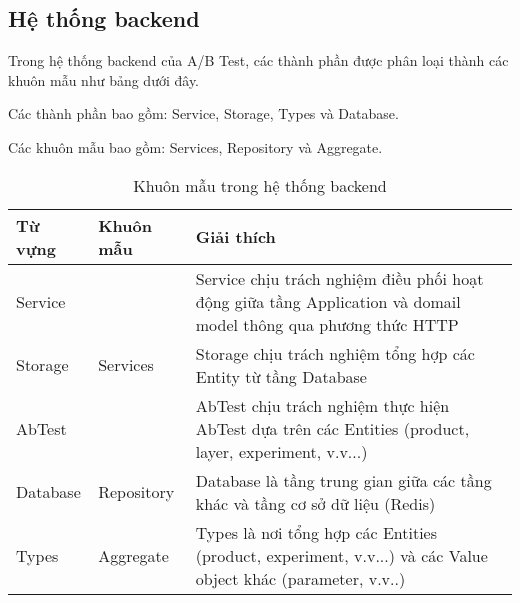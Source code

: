 \subsection{Hệ thống backend}

Trong hệ thống backend của A/B Test, các thành phần được phân loại thành các khuôn mẫu như bảng dưới đây.

Các thành phần bao gồm: Service, Storage, Types và Database.

Các khuôn mẫu bao gồm: Services, Repository và Aggregate.

\begin{table}[H]
	\centering
	\begin{tabular}{|l|l|p{12cm}|}
		\hline
		Từ vựng  & Khuôn mẫu                 & Giải thích                                                                                                     \\ \hline
		Service  & \multirow{3}{*}{Services} & Service chịu trách nghiệm điều phối hoạt động giữa tầng Application và domail model thông qua phương thức HTTP \\ \cline{1-1} \cline{3-3}
		Storage  &                           & Storage chịu trách nghiệm tổng hợp các Entity từ tầng Database                                                 \\ \cline{1-1} \cline{3-3}
		AbTest   &                           & AbTest chịu trách nghiệm thực hiện AbTest dựa trên các Entities (product, layer, experiment, v.v...)           \\ \hline
		Database & Repository                & Database là tầng trung gian giữa các tầng khác và tầng cơ sở dữ liệu (Redis)                                   \\ \hline
		Types    & Aggregate                 & Types là nơi tổng hợp các Entities (product, experiment, v.v...) và các Value object khác (parameter, v.v..)   \\ \hline
	\end{tabular}
	\caption{Khuôn mẫu trong hệ thống backend}
\end{table}



